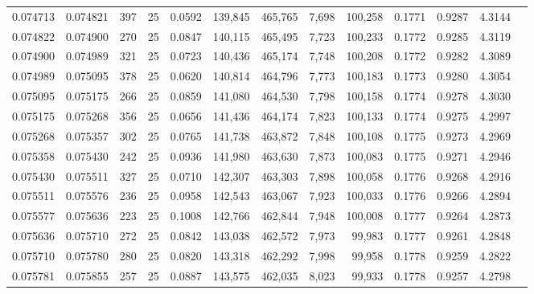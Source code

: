 \begin{tabular}{rrrrrrrrrrrrr}
0.074713 & 0.074821 &   397 &  25 &                                     0.0592 & 139,845 & 465,765 &   7,698 & 100,258 & 0.1771 & 0.9287 & 4.3144 \\
0.074822 & 0.074900 &   270 &  25 &                                     0.0847 & 140,115 & 465,495 &   7,723 & 100,233 & 0.1772 & 0.9285 & 4.3119 \\
0.074900 & 0.074989 &   321 &  25 &                                     0.0723 & 140,436 & 465,174 &   7,748 & 100,208 & 0.1772 & 0.9282 & 4.3089 \\
0.074989 & 0.075095 &   378 &  25 &                                     0.0620 & 140,814 & 464,796 &   7,773 & 100,183 & 0.1773 & 0.9280 & 4.3054 \\
0.075095 & 0.075175 &   266 &  25 &                                     0.0859 & 141,080 & 464,530 &   7,798 & 100,158 & 0.1774 & 0.9278 & 4.3030 \\
0.075175 & 0.075268 &   356 &  25 &                                     0.0656 & 141,436 & 464,174 &   7,823 & 100,133 & 0.1774 & 0.9275 & 4.2997 \\
0.075268 & 0.075357 &   302 &  25 &                                     0.0765 & 141,738 & 463,872 &   7,848 & 100,108 & 0.1775 & 0.9273 & 4.2969 \\
0.075358 & 0.075430 &   242 &  25 &                                     0.0936 & 141,980 & 463,630 &   7,873 & 100,083 & 0.1775 & 0.9271 & 4.2946 \\
0.075430 & 0.075511 &   327 &  25 &                                     0.0710 & 142,307 & 463,303 &   7,898 & 100,058 & 0.1776 & 0.9268 & 4.2916 \\
0.075511 & 0.075576 &   236 &  25 &                                     0.0958 & 142,543 & 463,067 &   7,923 & 100,033 & 0.1776 & 0.9266 & 4.2894 \\
0.075577 & 0.075636 &   223 &  25 &                                     0.1008 & 142,766 & 462,844 &   7,948 & 100,008 & 0.1777 & 0.9264 & 4.2873 \\
0.075636 & 0.075710 &   272 &  25 &                                     0.0842 & 143,038 & 462,572 &   7,973 &  99,983 & 0.1777 & 0.9261 & 4.2848 \\
0.075710 & 0.075780 &   280 &  25 &                                     0.0820 & 143,318 & 462,292 &   7,998 &  99,958 & 0.1778 & 0.9259 & 4.2822 \\
0.075781 & 0.075855 &   257 &  25 &                                     0.0887 & 143,575 & 462,035 &   8,023 &  99,933 & 0.1778 & 0.9257 & 4.2798 \\

\end{tabular}
